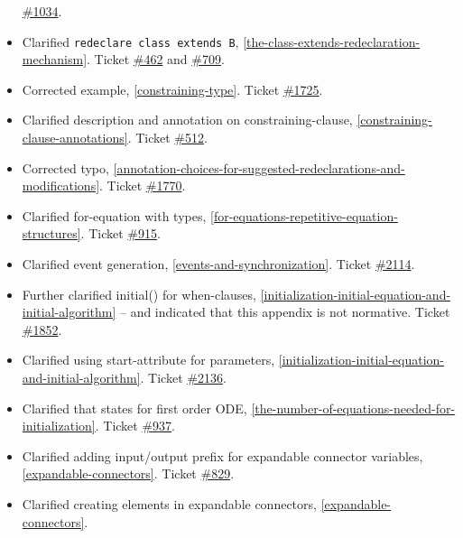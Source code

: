 \begin{itemize}
  \href{https://github.com/modelica/ModelicaSpecification/issues/1034}{\#1034}.
\item
  Clarified \lstinline!redeclare class extends B!, \autoref{the-class-extends-redeclaration-mechanism}. Ticket
  \href{https://github.com/modelica/ModelicaSpecification/issues/462}{\#462} and
  \href{https://github.com/modelica/ModelicaSpecification/issues/709}{\#709}.
\item
  Corrected example, \autoref{constraining-type}. Ticket
  \href{https://github.com/modelica/ModelicaSpecification/issues/1725}{\#1725}.
\item
  Clarified description and annotation on constraining-clause, \autoref{constraining-clause-annotations}. Ticket
  \href{https://github.com/modelica/ModelicaSpecification/issues/512}{\#512}.
\item
  Corrected typo, \autoref{annotation-choices-for-suggested-redeclarations-and-modifications}. Ticket
  \href{https://github.com/modelica/ModelicaSpecification/issues/1770}{\#1770}.
\item
  Clarified for-equation with types, \autoref{for-equations-repetitive-equation-structures}. Ticket
  \href{https://github.com/modelica/ModelicaSpecification/issues/915}{\#915}.
\item
  Clarified event generation, \autoref{events-and-synchronization}. Ticket
  \href{https://github.com/modelica/ModelicaSpecification/issues/2114}{\#2114}.
\item
  Further clarified initial() for when-clauses, \autoref{initialization-initial-equation-and-initial-algorithm} -- and
  indicated that this appendix is not normative. Ticket
  \href{https://github.com/modelica/ModelicaSpecification/issues/1852}{\#1852}.
\item
  Clarified using start-attribute for parameters, \autoref{initialization-initial-equation-and-initial-algorithm}. Ticket
  \href{https://github.com/modelica/ModelicaSpecification/issues/2136}{\#2136}.
\item
  Clarified that states for first order ODE, \autoref{the-number-of-equations-needed-for-initialization}. Ticket
  \href{https://github.com/modelica/ModelicaSpecification/issues/937}{\#937}.
\item
  Clarified adding input/output prefix for expandable connector
  variables, \autoref{expandable-connectors}. Ticket
  \href{https://github.com/modelica/ModelicaSpecification/issues/829}{\#829}.
\item
  Clarified creating elements in expandable connectors, \autoref{expandable-connectors}.

\end{itemize}
